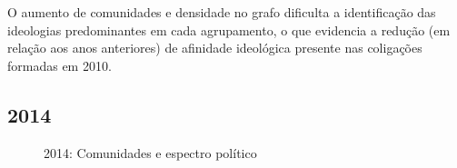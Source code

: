 O aumento de comunidades e densidade no grafo dificulta a identificação das ideologias predominantes em cada agrupamento, o que evidencia a redução (em relação aos anos anteriores) de afinidade ideológica presente nas coligações formadas em 2010.


\subsection{2014}
\label{resultados__grafos--2014}

\begin{figure}[H]
\center
    \qquad
    
    \caption{2014: Comunidades e espectro político}
\end{figure}

